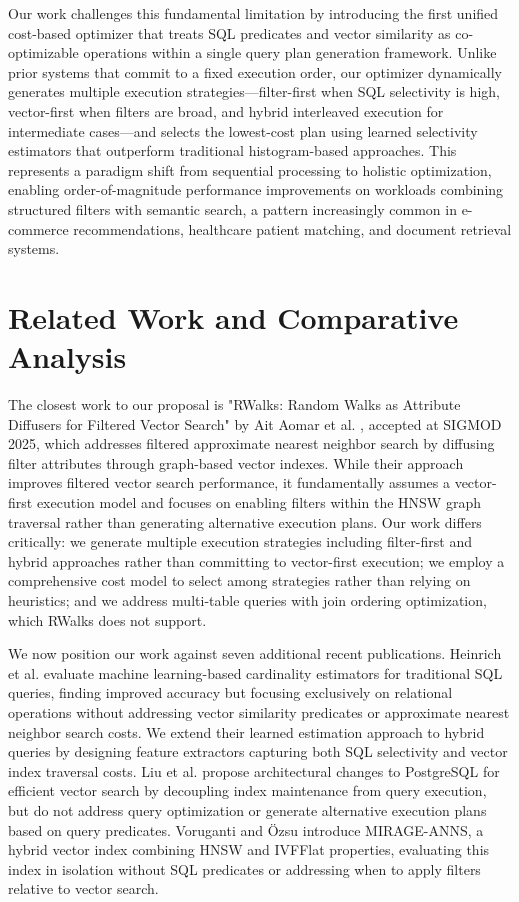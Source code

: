 \documentclass[conference]{IEEEtran}
\begin{document}
Our work challenges this fundamental limitation by introducing the first unified cost-based optimizer that treats SQL predicates and vector similarity as co-optimizable operations within a single query plan generation framework. Unlike prior systems that commit to a fixed execution order, our optimizer dynamically generates multiple execution strategies—filter-first when SQL selectivity is high, vector-first when filters are broad, and hybrid interleaved execution for intermediate cases—and selects the lowest-cost plan using learned selectivity estimators that outperform traditional histogram-based approaches. This represents a paradigm shift from sequential processing to holistic optimization, enabling order-of-magnitude performance improvements on workloads combining structured filters with semantic search, a pattern increasingly common in e-commerce recommendations, healthcare patient matching, and document retrieval systems.

\section{Related Work and Comparative Analysis}

The closest work to our proposal is "RWalks: Random Walks as Attribute Diffusers for Filtered Vector Search" by Ait Aomar et al. \cite{rwalks}, accepted at SIGMOD 2025, which addresses filtered approximate nearest neighbor search by diffusing filter attributes through graph-based vector indexes. While their approach improves filtered vector search performance, it fundamentally assumes a vector-first execution model and focuses on enabling filters within the HNSW graph traversal rather than generating alternative execution plans. Our work differs critically: we generate multiple execution strategies including filter-first and hybrid approaches rather than committing to vector-first execution; we employ a comprehensive cost model to select among strategies rather than relying on heuristics; and we address multi-table queries with join ordering optimization, which RWalks does not support.

We now position our work against seven additional recent publications. Heinrich et al. \cite{learned-cost} evaluate machine learning-based cardinality estimators for traditional SQL queries, finding improved accuracy but focusing exclusively on relational operations without addressing vector similarity predicates or approximate nearest neighbor search costs. We extend their learned estimation approach to hybrid queries by designing feature extractors capturing both SQL selectivity and vector index traversal costs. Liu et al. \cite{pg-vector} propose architectural changes to PostgreSQL for efficient vector search by decoupling index maintenance from query execution, but do not address query optimization or generate alternative execution plans based on query predicates. Voruganti and Özsu \cite{mirage} introduce MIRAGE-ANNS, a hybrid vector index combining HNSW and IVFFlat properties, evaluating this index in isolation without SQL predicates or addressing when to apply filters relative to vector search.
\end{document}
